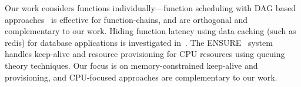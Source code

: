 %
Our work considers functions individually---function scheduling with DAG based approaches~\cite{carver_search_2019} is effective for function-chains, and are orthogonal and complementary to our work. 
%
Hiding function latency using data caching (such as redis) for database applications is investigated in~\cite{ghosh_caching_2019}. 
The ENSURE~\cite{ensure_acsos20} system handles keep-alive and resource provisioning for CPU resources using queuing theory techniques.
Our focus is on memory-constrained keep-alive and provisioning, and CPU-focused approaches are complementary to our work. 

\begin{comment}
\noindent \textbf{Caching.}
Our choice of Greedy-Dual-Size-Frequency was motivated by the ease with which its parameters mapped to function keep-alive, in particular the frequency vs. size tradeoff.
Cache eviction algorithms have a long history, although the focus has predominantly on uniform sized objects (such as disk blocks, RAM pages, cache lines, etc.).
Certain caching optimizations relying on spatial locality (such as look-ahead and ARC) are not directly applicable to keep-alive. 
The size-aware cache algorithms and models used for web-caches, proxies, and CDNs form the basis of our work. 
Cache provisioning using hit/miss ratio curves is a common approach, and these curves can also be constructed dynamically, which is part of our future work.
%
\end{comment}

